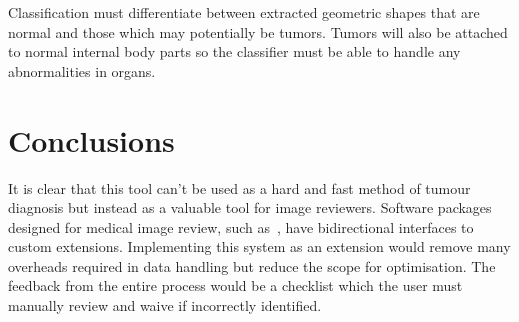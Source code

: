 \documentclass[journal]{IEEEtran}
\begin{document}
Classification must differentiate between extracted geometric shapes that are normal and those which may potentially be tumors.
Tumors will also be attached to normal internal body parts so the classifier must be able to handle any abnormalities in organs.







\section{Conclusions}
\label{sec:conclusions}

It is clear that this tool can't be used as a hard and fast method of tumour diagnosis but instead as a valuable tool for image reviewers.
Software packages designed for medical image review, such as~\cite{slicer}, have bidirectional interfaces to custom extensions.
Implementing this system as an extension would remove many overheads required in data handling but reduce the scope for optimisation.
The feedback from the entire process would be a checklist which the user must manually review and waive if incorrectly identified. 












\end{document}
